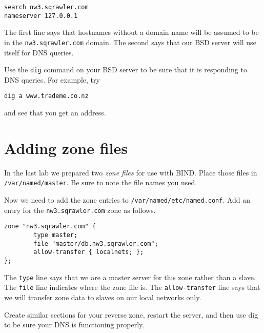 \documentclass{article}
\begin{document}
\begin{verbatim}
search nw3.sqrawler.com
nameserver 127.0.0.1
\end{verbatim}

The first line says that hostnames without a domain name will be assumed to be in the \texttt{nw3.sqrawler.com} domain.  The second says that our BSD server will use itself for DNS queries.

Use the \texttt{dig} command on your BSD server to be sure that it is responding to DNS queries.  For example, try 

\texttt{dig a www.trademe.co.nz}

and see that you get an address. 
\newpage
\section{Adding zone files}
In the last lab we prepared two \emph{zone files} for use with BIND.  Place those files in \texttt{/var/named/master}.  Be sure to note the file names you used.

Now we need to add the zone entries to \texttt{/var/named/etc/named.conf}.  Add an entry for the \texttt{nw3.sqrawler.com} zone as follows.

\begin{verbatim}
zone "nw3.sqrawler.com" {
        type master;
        file "master/db.nw3.sqrawler.com";
        allow-transfer { localnets; };
};
\end{verbatim}

The \texttt{type} line says that we are a master server for this zone rather than a slave.  The \texttt{file} line indicates where the zone file is.  The \texttt{allow-transfer} line says that we will transfer zone data to slaves on our local networks only.

Create similar sections for your reverse zone, restart the server, and then use dig to be sure your DNS is functioning properly.
\end{document}
